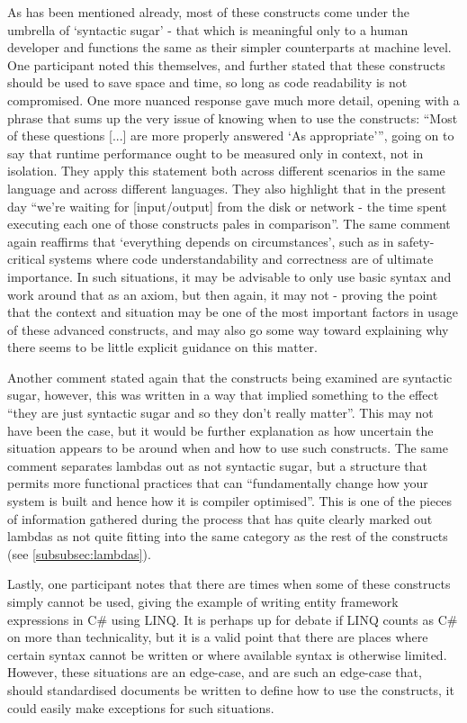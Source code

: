 \documentclass{article}
\begin{document}
            As has been mentioned already, most of these constructs come under the umbrella of `syntactic sugar' - that which is meaningful only to a human developer and functions the same as their simpler counterparts at machine level. One participant noted this themselves, and further stated that these constructs should be used to save space and time, so long as code readability is not compromised. One more nuanced response gave much more detail, opening with a phrase that sums up the very issue of knowing when to use the constructs: ``Most of these questions [...] are more properly answered `As appropriate''', going on to say that runtime performance ought to be measured only in context, not in isolation. They apply this statement both across different scenarios in the same language and across different languages. They also highlight that in the present day ``we're waiting for [input/output] from the disk or network - the time spent executing each one of those constructs pales in comparison''. The same comment again reaffirms that `everything depends on circumstances', such as in safety-critical systems where code understandability and correctness are of ultimate importance. In such situations, it may be advisable to only use basic syntax and work around that as an axiom, but then again, it may not - proving the point that the context and situation may be one of the most important factors in usage of these advanced constructs, and may also go some way toward explaining why there seems to be little explicit guidance on this matter.

            Another comment stated again that the constructs being examined are syntactic sugar, however, this was written in a way that implied something to the effect ``they are just syntactic sugar and so they don't really matter''. This may not have been the case, but it would be further explanation as how uncertain the situation appears to be around when and how to use such constructs. The same comment separates lambdas out as not syntactic sugar, but a structure that permits more functional practices that can ``fundamentally change how your system is built and hence how it is compiler optimised''. This is one of the pieces of information gathered during the process that has quite clearly marked out lambdas as not quite fitting into the same category as the rest of the constructs (see \ref{subsubsec:lambdas}).

            Lastly, one participant notes that there are times when some of these constructs simply cannot be used, giving the example of writing entity framework expressions in C\# using LINQ. It is perhaps up for debate if LINQ counts as C\# on more than technicality, but it is a valid point that there are places where certain syntax cannot be written or where available syntax is otherwise limited. However, these situations are an edge-case, and are such an edge-case that, should standardised documents be written to define how to use the constructs, it could easily make exceptions for such situations.
\end{document}
